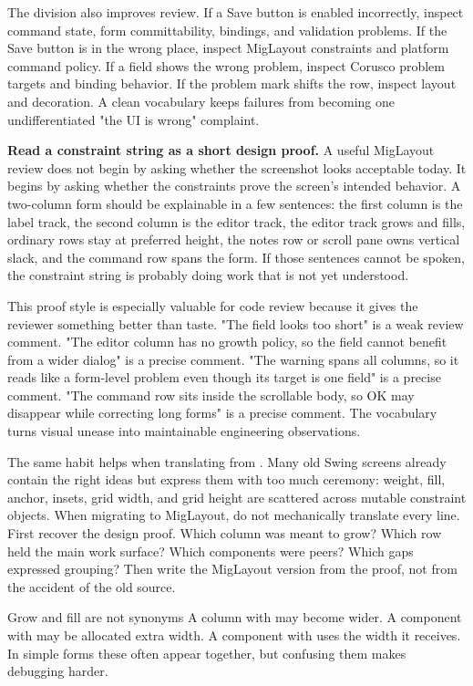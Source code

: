 The division also improves review. If a Save button is enabled incorrectly,
inspect command state, form committability, bindings, and validation problems.
If the Save button is in the wrong place, inspect MigLayout constraints and
platform command policy. If a field shows the wrong problem, inspect Corusco
problem targets and binding behavior. If the problem mark shifts the row,
inspect layout and decoration. A clean vocabulary keeps failures from becoming
one undifferentiated "the UI is wrong" complaint.

\textbf{Read a constraint string as a short design proof.} A useful MigLayout
review does not begin by asking whether the screenshot looks acceptable today.
It begins by asking whether the constraints prove the screen's intended
behavior. A two-column form should be explainable in a few sentences: the first
column is the label track, the second column is the editor track, the editor
track grows and fills, ordinary rows stay at preferred height, the notes row or
scroll pane owns vertical slack, and the command row spans the form. If those
sentences cannot be spoken, the constraint string is probably doing work that
is not yet understood.

This proof style is especially valuable for code review because it gives the
reviewer something better than taste. "The field looks too short" is a weak
review comment. "The editor column has no growth policy, so the field cannot
benefit from a wider dialog" is a precise comment. "The warning spans all
columns, so it reads like a form-level problem even though its target is one
field" is a precise comment. "The command row sits inside the scrollable body,
so OK may disappear while correcting long forms" is a precise comment. The
vocabulary turns visual unease into maintainable engineering observations.

The same habit helps when translating from . Many old Swing
screens already contain the right ideas but express them with too much
ceremony: weight, fill, anchor, insets, grid width, and grid height are scattered
across mutable constraint objects. When migrating to MigLayout, do not
mechanically translate every line. First recover the design proof. Which column
was meant to grow? Which row held the main work surface? Which components were
peers? Which gaps expressed grouping? Then write the MigLayout version from the
proof, not from the accident of the old source.

\begin{detailbox}{Grow and fill are not synonyms}
A column with  may become wider. A component with  may be allocated extra width. A component with  uses the width it receives. In simple forms these often appear together, but confusing them makes debugging harder.
\end{detailbox}

